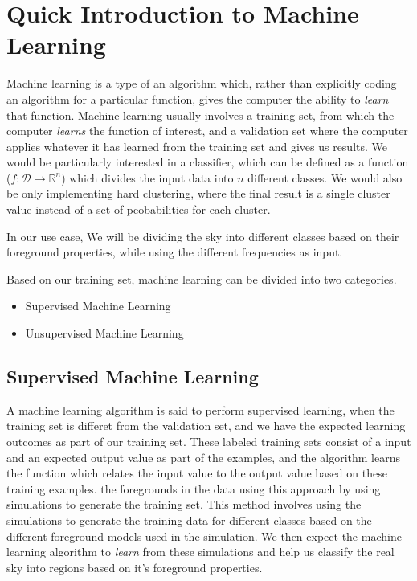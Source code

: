 \section{Quick Introduction to Machine Learning}
Machine learning is a type of an algorithm which, rather than explicitly coding an algorithm for a
particular function, gives the computer the ability to \emph{learn} that function. Machine learning usually involves a
training set, from which the computer \emph{learns} the function of interest, and a validation set where the computer applies
whatever it has learned from the training set and gives us results. We would be particularly interested in a classifier,
which can be defined as a function ($f: \mathcal{D} \rightarrow \mathbb{R}^n$) which divides the input data into $n$ different classes.
We would also be only implementing hard clustering, where the final result is a single cluster value instead of a set of peobabilities for each
cluster. 

In our use case, We will be dividing the sky into different classes based on their foreground properties, while using the different frequencies
as input.

Based on our training set, machine learning can be divided into two categories.
\begin{itemize}
    \item Supervised Machine Learning
    \item Unsupervised Machine Learning
\end{itemize}

\subsection{Supervised Machine Learning}
A machine learning algorithm is said to perform supervised learning, when the training set is differet from the validation set, and we
have the expected learning outcomes as part of our training set. These labeled training sets consist of a input and an expected output
value as part of the examples, and the algorithm learns the function which relates the input value to the output value based on these training examples.
 the foregrounds in the
data using this approach by using simulations to generate the training set. This method involves using the simulations to
generate the training data for different classes based on the different foreground models used in the simulation. We then expect the machine
learning algorithm to \emph{learn} from these simulations and help us classify the real sky into regions based on it's foreground properties.

